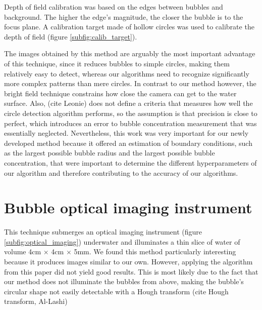 	Depth of field calibration was based on the edges between bubbles and background. The higher the edge's magnitude, the closer the bubble is to the focus plane. A calibration target made of hollow circles was used to calibrate the depth of field (figure \ref{subfig:calib_target}). 
	
	The images obtained by this method are arguably the most important advantage of this technique, since it reduces bubbles to simple circles, making them relatively easy to detect, whereas our algorithms need to recognize significantly more complex patterns than mere circles.
	 In contrast to our method however, the bright field technique constrains how close the camera can get to the water surface. Also, (cite Leonie) does not define a criteria that measures how well the circle detection algorithm performs, so the assumption is that precision is close to perfect, which introduces an error to bubble concentration measurement that was essentially neglected. 
	 Nevertheless, this work was very important for our newly developed method because it offered an estimation of boundary conditions, such as the largest possible bubble radius and the largest possible bubble concentration, that were important to determine the different hyperparameters of our algorithm and therefore contributing to the accuracy of our algorithms. 
	
	
\section{Bubble optical imaging instrument}
	This technique submerges an optical imaging instrument (figure \ref{subfig:optical_imaging}) underwater and illuminates a thin slice	of water of volume 4cm $\times$ 4cm $\times$ 5mm. We found this method  particularly interesting because it produces images similar to our own. However, applying the algorithm from this paper did not yield good results. This is most likely due to the fact that our method does not illuminate the bubbles from above, making the bubble's circular shape not easily detectable with a Hough transform (cite Hough transform, Al-Lashi)
	
